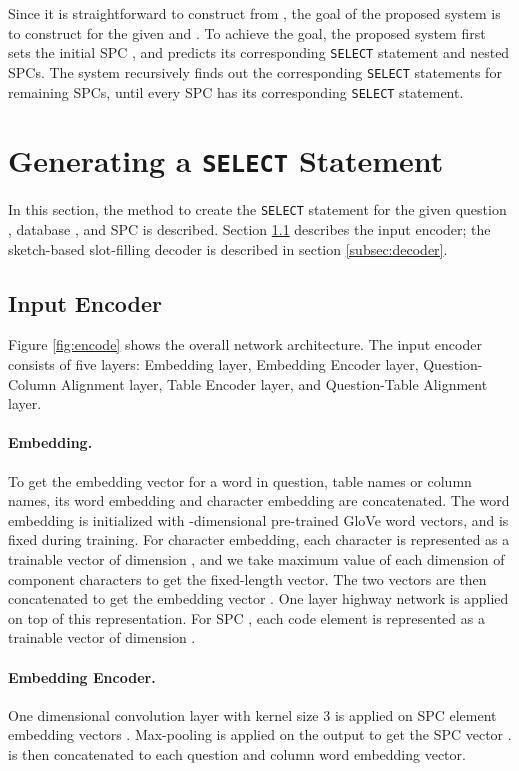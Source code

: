 \documentclass[11pt,a4paper]{article}
\begin{document}
Since it is straightforward to construct  from , the goal of the proposed system is to construct  for the given  and . To achieve the goal, the proposed system first sets the initial SPC , and predicts its corresponding \texttt{SELECT} statement and nested SPCs. The system recursively finds out the corresponding \texttt{SELECT} statements for remaining SPCs, until every SPC has its corresponding \texttt{SELECT} statement. 

\section{Generating a \texttt{SELECT} Statement}
\label{sec:genselect}

In this section, the method to create the \texttt{SELECT} statement for the given question , database , and SPC  is described. Section \ref{subsec:encoder} describes the input encoder; the sketch-based slot-filling decoder is described in section \ref{subsec:decoder}.

\subsection{Input Encoder}
\label{subsec:encoder}

Figure \ref{fig:encode} shows the overall network architecture. The input encoder consists of five layers: Embedding layer, Embedding Encoder layer, Question-Column Alignment layer, Table Encoder layer, and Question-Table Alignment layer. 

\paragraph{Embedding.} To get the embedding vector for a word  in question, table names or column names, its word embedding and character embedding are concatenated. The word embedding is initialized with -dimensional pre-trained GloVe \citep{pennington14} word vectors, and is fixed during training. For character embedding, each character is represented as a trainable vector of dimension , and we take maximum value of each dimension of component characters to get the fixed-length vector. The two vectors are then concatenated to get the embedding vector .  One layer highway network \citep{highway} is applied on top of this representation. For SPC , each code element   is represented as a trainable vector of dimension . 

\paragraph{Embedding Encoder.} One dimensional convolution layer with kernel size 3 is applied on SPC element embedding vectors . Max-pooling is applied on the output to get the SPC vector .  is then concatenated to each question and column word embedding vector. 
\end{document}
